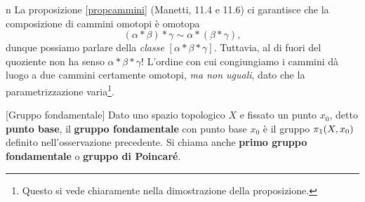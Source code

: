 \begin{warning}{n}
	La proposizione \ref{propcammini} (Manetti, 11.4 e 11.6) ci garantisce che la composizione di cammini omotopi è omotopa
	\begin{equation*}
		\left(\alpha\ast\beta\right)\ast \gamma \sim \alpha\ast\left(\beta\ast\gamma\right),
	\end{equation*}
	dunque possiamo parlare della \textit{classe} $\left[\alpha\ast\beta\ast\gamma\right]$. Tuttavia, al di fuori del quoziente non ha senso $\alpha\ast\beta\ast\gamma$! L'ordine con cui congiungiamo i cammini dà luogo a due cammini certamente omotopi, \textit{ma non uguali}, dato che la parametrizzazione varia\footnote{Questo si vede chiaramente nella dimostrazione della proposizione.}.
\end{warning}
\begin{definition}{}[Gruppo fondamentale]
	Dato uno spazio topologico $X$ e fissato un punto $x_0$, detto \textbf{punto base}, il \textbf{gruppo fondamentale} con punto base $x_0$ è il gruppo $\homotopy[1]{X,x_0}$ definito nell'osservazione precedente. Si chiama anche \textbf{primo gruppo fondamentale} o \textbf{gruppo di Poincaré}.
\end{definition}
